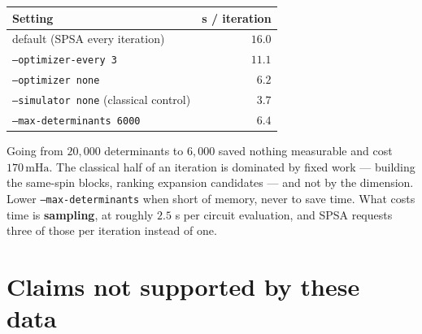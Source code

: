 \documentclass[11pt,a4paper]{article}
\newcommand{\mHa}{\ensuremath{\,\mathrm{mHa}}}
\newcommand{\code}[1]{\texttt{\small #1}}
\begin{document}
\begin{center}
\small
\begin{tabular}{lr}
\toprule
Setting & s / iteration \\
\midrule
default (SPSA every iteration)          & $16.0$ \\
\code{--optimizer-every 3}              & $11.1$ \\
\code{--optimizer none}                 & $\mathbf{6.2}$ \\
\code{--simulator none} (classical control) & $3.7$ \\
\code{--max-determinants 6000}          & $6.4$ \\
\bottomrule
\end{tabular}
\end{center}

\begin{result}
Going from $20{,}000$ determinants to $6{,}000$ saved nothing measurable and cost
$170\mHa$. The classical half of an iteration is dominated by fixed work ---
building the same-spin blocks, ranking expansion candidates --- and not by the
dimension. Lower \code{--max-determinants} when short of memory, never to save
time. What costs time is \textbf{sampling}, at roughly $2.5$ s per circuit
evaluation, and SPSA requests three of those per iteration instead of one.
\end{result}

\section{Claims not supported by these data}
\end{document}
